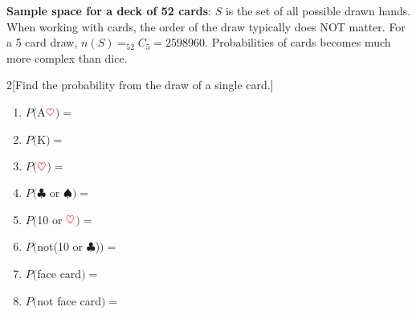 \documentclass[14pt]{extarticle}
\begin{document}
\textbf{Sample space for a deck of 52 cards}: $S$ is the set of all possible drawn hands. When working with cards, the order of the draw typically does NOT matter. For a 5 card draw, $n(S)=_{52}C_5 = 2598960$. Probabilities of cards becomes much more complex than dice.

\begin{multicols}{2}[Find the probability from the draw of a single card.]
	\begin{enumerate}
		\item $P($A$\color{red}\heartsuit$$)=$ \vspace{1.3cm}
		\item $P($K$)=$ \vspace{1.3cm}
		\item $P($$\color{red}\heartsuit$$)=$ \vspace{1.3cm}
		\item $P($$\clubsuit$ or $\spadesuit$$)=$ \vfill\null\columnbreak
		\item $P($10 or $\color{red}\heartsuit$$)=$ \vspace{1.3cm}
		\item $P($not(10 or $\clubsuit$)$)=$ \vspace{1.3cm}
		\item $P($face card$)=$ \vspace{1.3cm}
		\item $P($not face card$)=$ \vfill\null
	\end{enumerate}
\end{multicols}
\vspace{1cm}
\end{document}
